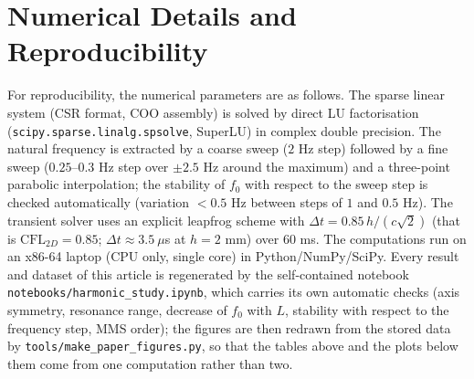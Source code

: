 \documentclass[11pt,a4paper,twocolumn]{article}
\begin{document}
\section{Numerical Details and Reproducibility}
\label{sec:repro}
For reproducibility, the numerical parameters are as follows. The sparse linear system (CSR format, COO assembly) is solved by direct LU factorisation (\texttt{scipy.sparse.linalg.spsolve}, SuperLU) in complex double precision. The natural frequency is extracted by a coarse sweep ($2$ Hz step) followed by a fine sweep ($0.25$--$0.3$ Hz step over $\pm2.5$ Hz around the maximum) and a three-point parabolic interpolation; the stability of $f_0$ with respect to the sweep step is checked automatically (variation $<0.5$ Hz between steps of $1$ and $0.5$ Hz). The transient solver uses an explicit leapfrog scheme with $\Delta t = 0.85\,h/(c\sqrt{2})$ (that is $\mathrm{CFL}_{2D}=0.85$; $\Delta t \approx 3.5\ \mu$s at $h=2$ mm) over $60$ ms. The computations run on an x86-64 laptop (CPU only, single core) in Python/NumPy/SciPy. Every result and dataset of this article is regenerated by the self-contained notebook \texttt{notebooks/harmonic\_study.ipynb}, which carries its own automatic checks (axis symmetry, resonance range, decrease of $f_0$ with $L$, stability with respect to the frequency step, MMS order); the figures are then redrawn from the stored data by \texttt{tools/make\_paper\_figures.py}, so that the tables above and the plots below them come from one computation rather than two.
\end{document}
